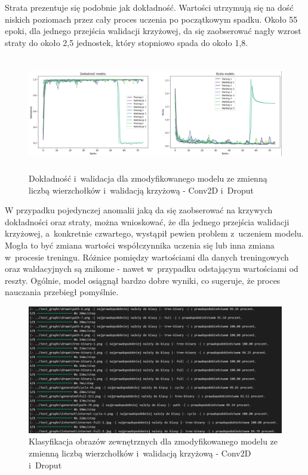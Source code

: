 Strata prezentuje się podobnie jak dokładność.
Wartości utrzymują się na dość niskich poziomach przez cały proces uczenia po początkowym spadku.
Około 55 epoki, dla jednego przejścia walidacji krzyżowej,
da się zaobserować nagły wzrost straty do około 2,5 jednostek, który stopniowo spada do około 1,8.

\begin{figure}[ht]
	\centering
	\includegraphics[height=5cm]{resources/tests/images/v4/multiple_edges_crossvalid_1_img.png}
	\caption{Dokładność i~walidacja dla zmodyfikowanego modelu ze zmienną liczbą wierzchołków i~walidacją krzyżową - Conv2D i~Droput}
	\label{Fig:tests-csvar-1a}
\end{figure}
\FloatBarrier

W przypadku pojedynczej anomalii jaką da się zaobserować na krzywych dokładności oraz straty,
można wnioskować, że dla jednego przejścia walidacji krzyżowej, a~konkretnie czwartego, wystąpił pewien problem z~uczeniem modelu.
Mogła to być zmiana wartości współczynnika uczenia się lub inna zmiana w~procesie treningu.
Różnice pomiędzy wartościami dla danych treningowych oraz waldacyjnych są znikome - nawet w~przypadku odstającym wartościami od reszty.
Ogólnie, model osiągnął bardzo dobre wyniki, co sugeruje, że proces nauczania przebiegł pomyślnie.

\begin{figure}[ht]
	\centering
	\includegraphics[width=14cm]{resources/tests/images/v4/multiple_edges_crossvalid_1_txt.png}
	\caption{Klasyfikacja obrazów zewnętrznych dla zmodyfikowanego modelu ze zmienną liczbą wierzchołków i~walidacją krzyżową - Conv2D i~Droput}
	\label{Fig:tests-csvar-1b}
\end{figure}
\FloatBarrier

